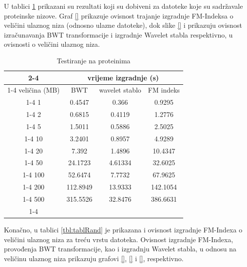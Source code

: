 U tablici \ref{tbl:tablProteini} prikazani su rezultati koji su dobiveni za datoteke koje su sadržavale proteinske nizove. Graf \ref{} prikazuje ovisnost trajanje izgradnje FM-Indeksa o veličini ulaznog niza (odnosno ulazne datoteke), dok slike \ref{} i \re{} prikazuju ovisnost izračunavanja BWT transformacije i izgradnje Wavelet stabla respektivno, u ovisnosti o veličini ulaznog niza.


\begin{table}[h]
\caption{Testiranje na proteinima}
\label{tbl:tablProteini}
\centering
\begin{tabular}{c|c|c|c|}
\cline{2-4}
      	    					 & \multicolumn{3}{c|}{vrijeme izgradnje (s)}  \\ \cline{1-4}
\multicolumn{1}{ |c| } {veličina (MB)} & BWT & wavelet stablo & FM indeks  \\ \cline{1-4}  
\multicolumn{1}{ |c| } {   1    } 		& 	0.4547	&	0.366	&	0.9295	\\ \cline{1-4}
\multicolumn{1}{ |c| } {   2    } 		& 	0.6815	&	0.4119	&	1.2776	\\ \cline{1-4}
\multicolumn{1}{ |c| } {   5    } 		& 	1.5011	&	0.5886	&	2.5025	\\ \cline{1-4}
\multicolumn{1}{ |c| } {   10    } 	&	3.2401	&	0.8957	&	4.9289	\\ \cline{1-4}
\multicolumn{1}{ |c| } {   20    } 	&	7.392		&	1.4896	&	10.4347	\\ \cline{1-4}
\multicolumn{1}{ |c| } {   50    } 	&	24.1723	&	4.61334	&	32.6025	\\ \cline{1-4}
\multicolumn{1}{ |c| } {   100    } 	&	52.6474	&	7.7732	&	67.9625	\\ \cline{1-4}
\multicolumn{1}{ |c| } {   200    } 	&	112.8949	&	13.9333	&	142.1054	\\ \cline{1-4}
\multicolumn{1}{ |c| } {   500    } 	&	315.5526	&	32.8476	&	386.6631	\\ \cline{1-4}
\end{tabular}
\end{table}




Konačno, u tablici \ref{tbl:tablRand} je prikazana i ovisnost izgradnje FM-Indexa o veličini ulaznog niza za treću vrstu datoteka. Ovisnost izgradnje FM-Indexa, provođenja BWT transformacije, kao i izgradnju Wavelet stabla, u odnosu na veličinu ulaznog niza prikazuju grafovi \ref{}, \ref{} i \ref{}, respektivno.


